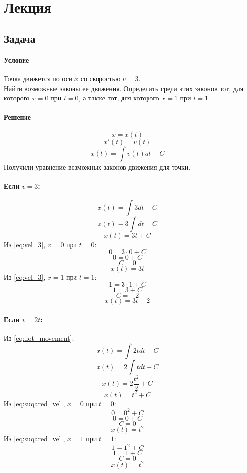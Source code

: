 \section{Лекция}

\subsection{Задача }
\paragraph{Условие}
Точка движется по оси $x$ со скоростью $v = 3$.\\
Найти возможные законы ее движения. Определить среди этих законов тот, для которого $x = 0$ при $t = 0$, а также тот, для которого $x = 1$ при $t = 1$. 
\paragraph{Решение}
\[x = x(t)\]
\[x'(t) = v(t)\]
\begin{equation}
  x(t) = \int v(t)dt + C
  \label{eq:dot_movement}
\end{equation}
Получили уравнение возможных законов движения для точки.
\paragraph{Если $v = 3$:}
\[x(t) = \int 3dt + C\]
\[x(t) = 3\int dt + C\]
\begin{equation}
  x(t) = 3t + C
  \label{eq:vel_3}
\end{equation}
Из \ref{eq:vel_3}, $x = 0$ при $t = 0$:
\[0 = 3 \cdot 0 + C\]
\[0 = 0 + C\]
\[C = 0\]
\[x(t) = 3t\]
Из \ref{eq:vel_3}, $x = 1$ при $t = 1$:
\[1 = 3 \cdot 1 + C\]
\[1 = 3 + C\]
\[C = -2\]
\[x(t) = 3t - 2\]
\paragraph{Если $v = 2t$:}
Из \ref{eq:dot_movement}:
\[x(t) = \int 2t dt + C\]
\[x(t) = 2 \int t dt + C\]
\[x(t) = 2 \frac{t^2}{2} + C\]
\begin{equation}
  x(t) = t^2 + C
  \label{eq:suqared_vel}
\end{equation}
Из \ref{eq:suqared_vel}, $x = 0$ при $t = 0$:
\[0 = 0^2 + C\]
\[0 = 0 + C\]
\[C = 0\]
\[x(t) = t^2\]
Из \ref{eq:suqared_vel}, $x = 1$ при $t = 1$:
\[1 = 1^2 + C\]
\[1 = 1 + C\]
\[C = 0\]
\[x(t) = t^2\]
